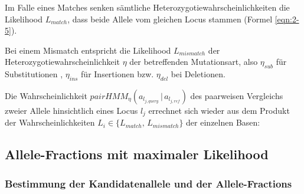 Im Falle eines Matches senken sämtliche Heterozygotiewahrscheinlichkeiten die Likelihood $L_{match}$, dass beide Allele vom gleichen Locus stammen (Formel \eqref{eqn:2-5}).
\vspace{-0.5cm}
\begin{center}
\end{center}
Bei einem Mismatch entspricht die Likelihood $L_{mismatch}$ der Heterozygotiewahrscheinlichkeit $ \eta $ der betreffenden Mutationsart, also $ \eta_{sub} $ für Substitutionen , $ \eta_{ins} $ für Insertionen bzw. $ \eta_{del} $ bei Deletionen. 
\vspace{-0.5cm}
\begin{center}
\end{center}

Die Wahrscheinlichkeit $ pairHMM_{\eta}(a_{l_{j,query}} \, | \, a_{l_{j,ref}}) $ des  paarweisen Vergleichs zweier Allele hinsichtlich eines Locus $l_{j}$ errechnet sich wieder aus dem Produkt der Wahrscheinlichkeiten $L_{i} \in \{L_{match}, \, L_{mismatch}\}$ der einzelnen Basen:
\vspace{-0.5cm}
\begin{center}
\end{center}

\subsection{Allele-Fractions mit maximaler Likelihood} \label{subsec:sol_allele_lh}
\subsubsection{Bestimmung der Kandidatenallele und der Allele-Fractions} \label{subsec:sol_cand_allele}

